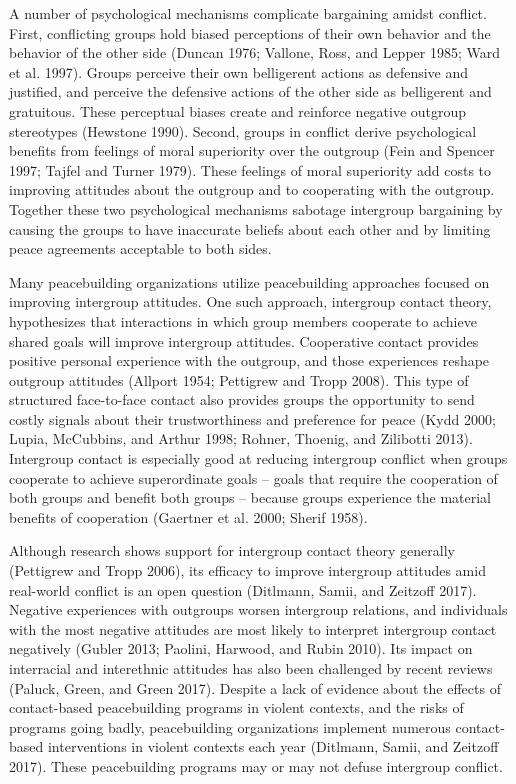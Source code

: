 \documentclass[11pt]{article}
\begin{document}
A number of psychological mechanisms complicate bargaining amidst
conflict. First, conflicting groups hold biased perceptions of their own
behavior and the behavior of the other side (Duncan 1976; Vallone, Ross,
and Lepper 1985; Ward et al. 1997). Groups perceive their own
belligerent actions as defensive and justified, and perceive the
defensive actions of the other side as belligerent and gratuitous. These
perceptual biases create and reinforce negative outgroup stereotypes
(Hewstone 1990). Second, groups in conflict derive psychological
benefits from feelings of moral superiority over the outgroup (Fein and
Spencer 1997; Tajfel and Turner 1979). These feelings of moral
superiority add costs to improving attitudes about the outgroup and to
cooperating with the outgroup. Together these two psychological
mechanisms sabotage intergroup bargaining by causing the groups to have
inaccurate beliefs about each other and by limiting peace agreements
acceptable to both sides.

Many peacebuilding organizations utilize peacebuilding approaches
focused on improving intergroup attitudes. One such approach, intergroup
contact theory, hypothesizes that interactions in which group members
cooperate to achieve shared goals will improve intergroup attitudes.
Cooperative contact provides positive personal experience with the
outgroup, and those experiences reshape outgroup attitudes (Allport
1954; Pettigrew and Tropp 2008). This type of structured face-to-face
contact also provides groups the opportunity to send costly signals
about their trustworthiness and preference for peace (Kydd 2000; Lupia,
McCubbins, and Arthur 1998; Rohner, Thoenig, and Zilibotti 2013).
Intergroup contact is especially good at reducing intergroup conflict
when groups cooperate to achieve superordinate goals -- goals that
require the cooperation of both groups and benefit both groups --
because groups experience the material benefits of cooperation (Gaertner
et al. 2000; Sherif 1958).

Although research shows support for intergroup contact theory generally
(Pettigrew and Tropp 2006), its efficacy to improve intergroup attitudes
amid real-world conflict is an open question (Ditlmann, Samii, and
Zeitzoff 2017). Negative experiences with outgroups worsen intergroup
relations, and individuals with the most negative attitudes are most
likely to interpret intergroup contact negatively (Gubler 2013; Paolini,
Harwood, and Rubin 2010). Its impact on interracial and interethnic
attitudes has also been challenged by recent reviews (Paluck, Green, and
Green 2017). Despite a lack of evidence about the effects of
contact-based peacebuilding programs in violent contexts, and the risks
of programs going badly, peacebuilding organizations implement numerous
contact-based interventions in violent contexts each year (Ditlmann,
Samii, and Zeitzoff 2017). These peacebuilding programs may or may not
defuse intergroup conflict.
\end{document}

